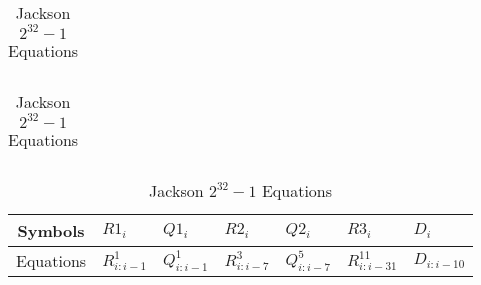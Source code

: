 \begin{table}[H]
\begin{tabularx}{\textwidth}{|| c | X ||}
    
    \end{tabularx}
    
    \begin{tabularx}{\textwidth}{X} 
    \\
    \end{tabularx}  
    
    
    \begin{tabularx}{\textwidth}{| c | X X X X X X | } 
        \hline
        Symbols & $R1_i$ & $Q1_i$ & $R2_i$ & $Q2_i$ & $R3_i$ & $D_i$ \\
        \hline
        Equations & $R^1_{i:i-1}$ & $Q^1_{i:i-1}$ & $R^3_{i:i-7}$ & $Q^5_{i:i-7}$ 
        & $R^{11}_{i:i-31}$ & $ D_{i:i-10}$ \\
        \hline
    \end{tabularx}
    
    
\caption{Jackson $2^{32}-1$ Equations}
\end{table}

